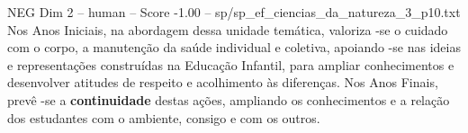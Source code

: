 \begin{textsample}{NEG Dim 2 – human – Score -1.00 – sp/sp\_ef\_ciencias\_da\_natureza\_3\_p10.txt}  \label{ex:f2_neg_008}
Nos Anos Iniciais, na abordagem dessa unidade temática, valoriza -se o cuidado com o corpo, a manutenção da saúde individual e coletiva, apoiando -se nas ideias e representações construídas na Educação Infantil, para ampliar conhecimentos e desenvolver atitudes de respeito e acolhimento às diferenças.
Nos Anos Finais, prevê -se a \textbf{continuidade} destas ações, ampliando os conhecimentos e a relação dos estudantes com o ambiente, consigo e com os outros.

\end{textsample}
